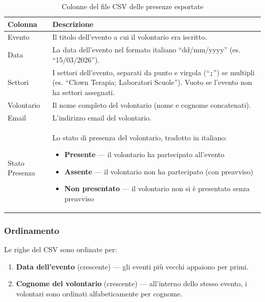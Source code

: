 \documentclass[a4paper,11pt,oneside]{book}
\begin{document}
\begin{table}[htbp]
\centering
\caption{Colonne del file CSV delle presenze esportate}
\label{tab:colonne-csv-presenze}
\begin{tabularx}{\textwidth}{l X}
\toprule
\textbf{Colonna} & \textbf{Descrizione} \\
\midrule
Evento           & Il titolo dell'evento a cui il volontario era iscritto. \\
Data             & La data dell'evento nel formato italiano ``dd/mm/yyyy'' (es. ``15/03/2026''). \\
Settori          & I settori dell'evento, separati da punto e virgola (``\texttt{;}'') se multipli (es. ``Clown Terapia; Laboratori Scuole''). Vuoto se l'evento non ha settori assegnati. \\
Volontario       & Il nome completo del volontario (nome e cognome concatenati). \\
Email            & L'indirizzo email del volontario. \\
Stato Presenza   & Lo stato di presenza del volontario, tradotto in italiano:
                   \begin{itemize}[leftmargin=1em, topsep=0pt]
                     \item \textbf{Presente} --- il volontario ha partecipato all'evento
                     \item \textbf{Assente} --- il volontario non ha partecipato (con preavviso)
                     \item \textbf{Non presentato} --- il volontario non si \`e presentato senza preavviso
                   \end{itemize} \\
\bottomrule
\end{tabularx}
\end{table}

\subsubsection{Ordinamento}

Le righe del CSV sono ordinate per:

\begin{enumerate}[leftmargin=1.5em]
  \item \textbf{Data dell'evento} (crescente) --- gli eventi pi\`u vecchi appaiono per primi.
  \item \textbf{Cognome del volontario} (crescente) --- all'interno dello stesso evento, i volontari sono ordinati alfabeticamente per cognome.
\end{enumerate}
\end{document}
